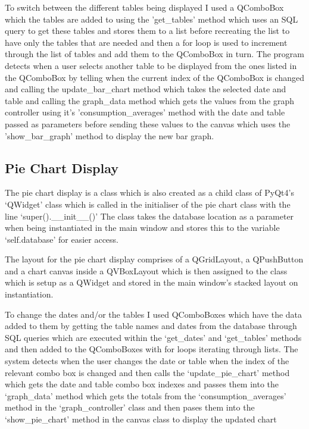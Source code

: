 To switch between the different tables being displayed I used a QComboBox which the tables are added to using the 'get\_tables' method which uses an SQL query to get these tables and stores them to a list before recreating the list to have only the tables that are needed and then a for loop is used to increment through the list of tables and add them to the QComboBox in turn. The program detects when a user selects another table to be displayed from the ones listed in the QComboBox by telling when the current index of the QComboBox is changed and calling the update\_bar\_chart method which takes the selected date and table and calling the graph\_data method which gets the values from the graph controller using it's 'consumption\_averages' method with the date and table passed as parameters before sending these values to the canvas which uses the 'show\_bar\_graph' method to display the new bar graph.

\subsection{Pie Chart Display}
The pie chart display is a class which is also created as a child class of PyQt4's `QWidget' class which is called in the initialiser of the pie chart class with the line `super().\_\_init\_\_()'  The class takes the database location as a parameter when being instantiated in the main window and stores this to the variable `self.database' for easier access.

The layout for the pie chart display comprises of a QGridLayout, a QPushButton and a chart canvas inside a QVBoxLayout which is then assigned to the class which is setup as a QWidget and stored in the main window's stacked layout on instantiation.

To change the dates and/or the tables I used QComboBoxes which have the data added to them by getting the table names and dates from the database through SQL queries which are executed within the `get\_dates' and `get\_tables' methods and then added to the QComboBoxes with for loops iterating through lists. The system detects when the user changes the date or table when the index of the relevant combo box is changed and then calls the `update\_pie\_chart' method which gets the date and table combo box indexes and passes them into the `graph\_data' method which gets the totals from the `consumption\_averages' method in the `graph\_controller' class and then pases them into the `show\_pie\_chart' method in the canvas class to display the updated chart

